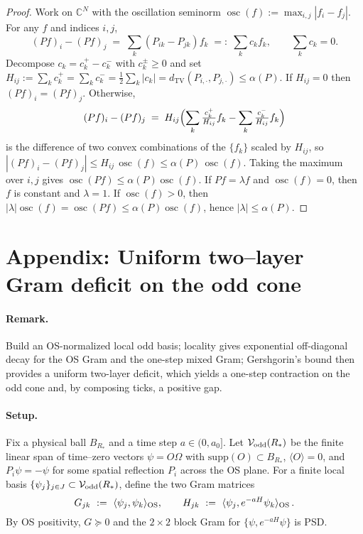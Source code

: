 \documentclass[11pt]{amsart}
\theoremstyle{plain}
\theoremstyle{definition}
\theoremstyle{remark}
\begin{document}
\begin{proof}
Work on $\mathbb{C}^N$ with the oscillation seminorm $\operatorname{osc}(f):=\max_{i,j}|f_i-f_j|$. For any $f$ and indices $i,j$,
\[
  (Pf)_i-(Pf)_j\;=\;\sum_k (P_{ik}-P_{jk}) f_k\;=:\;\sum_k c_k f_k,\qquad \sum_k c_k=0.
\]
Decompose $c_k=c_k^+-c_k^-$ with $c_k^\pm\ge 0$ and set $H_{ij}:=\sum_k c_k^+=\sum_k c_k^- = \tfrac12\sum_k |c_k| = d_{\mathrm{TV}}(P_{i,\cdot},P_{j,\cdot})\le \alpha(P)$. If $H_{ij}=0$ then $(Pf)_i=(Pf)_j$. Otherwise,
\[
  (Pf)_i-(Pf)_j\;=\;H_{ij}\Bigl(\sum_k \tfrac{c_k^+}{H_{ij}} f_k - \sum_k \tfrac{c_k^-}{H_{ij}} f_k\Bigr)
\]
is the difference of two convex combinations of the $\{f_k\}$ scaled by $H_{ij}$, so $|(Pf)_i-(Pf)_j|\le H_{ij}\,\operatorname{osc}(f)\le \alpha(P)\,\operatorname{osc}(f)$. Taking the maximum over $i,j$ gives $\operatorname{osc}(Pf)\le \alpha(P)\operatorname{osc}(f)$. If $Pf=\lambda f$ and $\operatorname{osc}(f)=0$, then $f$ is constant and $\lambda=1$. If $\operatorname{osc}(f)>0$, then $|\lambda|\operatorname{osc}(f)=\operatorname{osc}(Pf)\le \alpha(P)\operatorname{osc}(f)$, hence $|\lambda|\le \alpha(P)$.
\end{proof}

\section{Appendix: Uniform two--layer Gram deficit on the odd cone}

\paragraph{Remark.} Build an OS-normalized local odd basis; locality gives exponential off-diagonal decay for the OS Gram and the one-step mixed Gram; Gershgorin's bound then provides a uniform two-layer deficit, which yields a one-step contraction on the odd cone and, by composing ticks, a positive gap.

\paragraph{Setup.}
Fix a physical ball $B_{R_*}$ and a time step $a\in(0,a_0]$. Let $\mathcal{V}_{\rm odd}(R_*)$ be the finite linear span of time--zero vectors $\psi=O\Omega$ with $\mathrm{supp}(O)\subset B_{R_*}$, $\langle O\rangle=0$, and $P_i\psi=-\psi$ for some spatial reflection $P_i$ across the OS plane. For a finite local basis $\{\psi_j\}_{j\in J}\subset \mathcal{V}_{\rm odd}(R_*)$, define the two Gram matrices
\[
  G_{jk}\ :=\ \langle\psi_j,\psi_k\rangle_{\rm OS},\qquad
  H_{jk}\ :=\ \langle\psi_j, e^{-aH}\psi_k\rangle_{\rm OS}\,.
\]
By OS positivity, $G\succeq 0$ and the $2\times 2$ block Gram for $\{\psi, e^{-aH}\psi\}$ is PSD.
\end{document}
